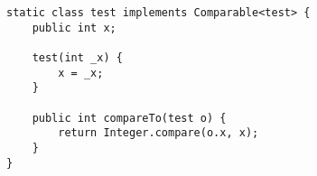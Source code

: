 \begin{verbatim}
static class test implements Comparable<test> {
	public int x;
		
	test(int _x) {
		x = _x;
	}
		
	public int compareTo(test o) {
		return Integer.compare(o.x, x);
	}
}
\end{verbatim}